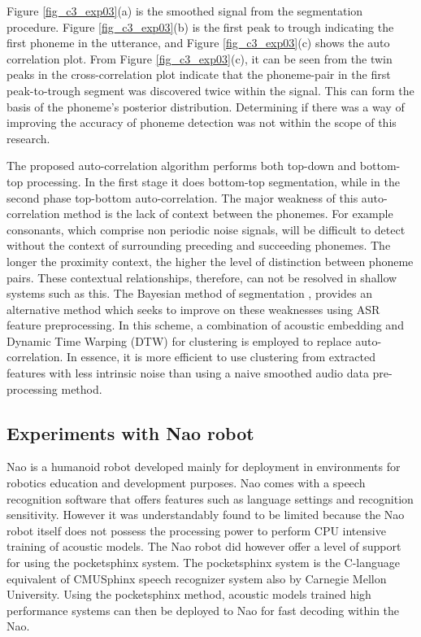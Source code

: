 \startblue
Figure \ref{fig_c3_exp03}(a) is the smoothed signal from the segmentation procedure.  Figure \ref{fig_c3_exp03}(b) is the first peak to trough indicating the first phoneme in the utterance, and Figure \ref{fig_c3_exp03}(c) shows the auto correlation plot.  From Figure \ref{fig_c3_exp03}(c), it can be seen from the twin peaks in the cross-correlation plot indicate that the phoneme-pair in the first peak-to-trough segment was discovered twice within the signal.  This can form the basis of the phoneme's posterior distribution. Determining if there was a way of improving the accuracy of phoneme detection was not within the scope of this research.

The proposed auto-correlation algorithm performs both top-down and bottom-top processing.  In the first stage it does bottom-top segmentation, while in the second phase top-bottom auto-correlation.   The major weakness of this auto-correlation method is the lack of context between the phonemes.  For example consonants, which comprise non periodic noise signals, will be difficult to detect without the context of surrounding preceding and succeeding phonemes. The longer the proximity context, the higher the level of distinction between phoneme pairs.  These contextual relationships, therefore, can not be resolved in shallow systems such as this.  The Bayesian method of segmentation \citep{kamper2016unsupervised}, provides an alternative method which seeks to improve on these weaknesses using ASR feature preprocessing.  In this scheme, a combination of acoustic embedding and Dynamic Time Warping (DTW) for clustering is employed to replace auto-correlation.  In essence, it is more efficient to use clustering from extracted features with less intrinsic noise than using a naive smoothed audio data pre-processing method.\stopblue

\subsection{Experiments with Nao robot}
Nao is a humanoid robot developed mainly for deployment in environments for robotics education and development purposes.  Nao comes with a speech recognition software that offers features such as language settings and recognition sensitivity.  However it was understandably found to be limited because the Nao robot itself does not possess the processing power to perform CPU intensive training of acoustic models.  The Nao robot did however offer a level of support for using the pocketsphinx system. The pocketsphinx system is the C-language equivalent of CMUSphinx speech recognizer system also by Carnegie Mellon University.  Using the pocketsphinx method, acoustic models trained high performance systems can then be deployed to Nao for fast decoding within the Nao.  

